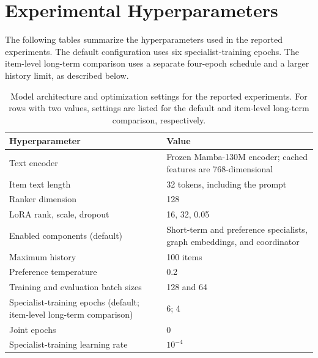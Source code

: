 ﻿\documentclass[sigconf,anonymous,review]{acmart}
\begin{document}
\section{Experimental Hyperparameters}
\label{app:hyperparameters}
The following tables summarize the hyperparameters used in the reported experiments. The default configuration uses six specialist-training epochs. The item-level long-term comparison uses a separate four-epoch schedule and a larger history limit, as described below.

\begin{table}[t]
    \centering
    \small
    \setlength{\tabcolsep}{5pt}
    \renewcommand{\arraystretch}{1.08}
    \begin{tabular}{p{}p{}}
        \toprule
        \textbf{Hyperparameter} & \textbf{Value} \\
        \midrule
        Text encoder & Frozen Mamba-130M encoder; cached features are 768-dimensional \\
        Item text length & 32 tokens, including the prompt \\
        Ranker dimension & 128 \\
        LoRA rank, scale, dropout & 16, 32, 0.05 \\
        Enabled components (default) & Short-term and preference specialists, graph embeddings, and coordinator \\
        Maximum history & 100 items \\
        Preference temperature & 0.2 \\
        Training and evaluation batch sizes & 128 and 64 \\
        Specialist-training epochs (default; item-level long-term comparison) & 6; 4 \\
        Joint epochs & 0 \\
        Specialist-training learning rate & $10^{-4}$ \\
        \bottomrule
    \end{tabular}
    \caption{Model architecture and optimization settings for the reported experiments. For rows with two values, settings are listed for the default and item-level long-term comparison, respectively.}
    \label{tab:hyperparameters_model}
\end{table}
\end{document}
